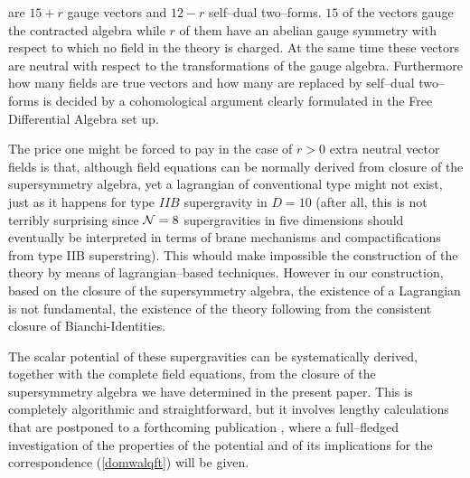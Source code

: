 \documentclass[a4paper,12pt]{article}
\begin{document}
are $15+r$ gauge vectors and $12-r$ self--dual two--forms. $15$ of the
vectors gauge the contracted algebra while $r$ of them have an abelian gauge symmetry with
respect to which no field in the theory is charged. At the same time these vectors are
neutral with respect to the transformations of the gauge algebra. Furthermore
how many fields are true vectors and how many are replaced by self--dual
two--forms is decided by a
cohomological argument clearly formulated in the Free Differential Algebra set up.
\par
The price one might be forced to pay in the case of $r>0$ extra
neutral vector fields is that, although field equations can be
normally derived from closure of the supersymmetry algebra, yet a
lagrangian of conventional type might not exist, just as it
happens for type $IIB$ supergravity in $D=10$ (after all, this is
not terribly surprising since ${\cal N}=8$ supergravities in five
dimensions should eventually be interpreted in terms of brane
mechanisms and compactifications from type IIB superstring).
This whould make impossible the construction of the theory
by means of lagrangian--based techniques.
However in our construction, based on the closure of the
supersymmetry algebra, the existence of a Lagrangian is not
fundamental, the existence of the theory following from the
consistent closure of Bianchi-Identities.

The scalar potential of these supergravities can be systematically
derived, together with the complete field equations, from the closure of the
supersymmetry algebra we have determined in the present paper.
This is completely algorithmic and straightforward, but it involves lengthy
calculations
that are postponed to a forthcoming publication \cite{next},
where a full--fledged investigation of the properties of the potential and of its
implications for the correspondence (\ref{domwalqft}) will be given.
\end{document}
